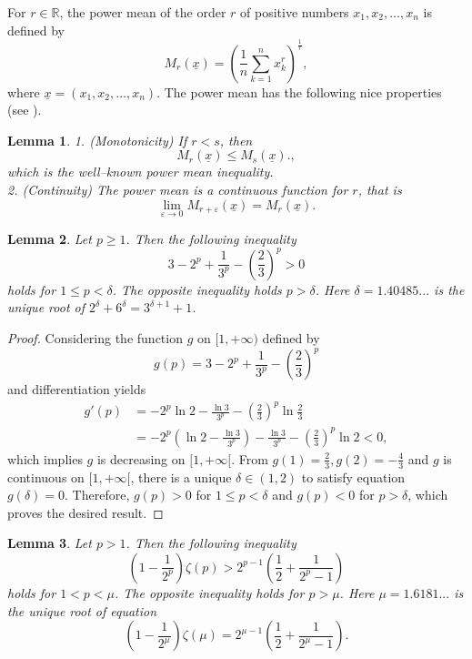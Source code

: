 \documentclass{amsart}
\newtheorem{lemma}{Lemma}
\begin{document}
For $r\in\mathbb{R}$, the power mean of the order $r$ of positive numbers $x_{1}, x_{2}, \ldots, x_{n}$ is defined by 
$$
M_{r}(\underline{x})=\left(\frac{1}{n} \sum_{k=1}^{n} x_{k}^{r}\right)^{\frac{1}{r}},
$$
where $\underline{x}=\left(x_{1}, x_{2}, \ldots, x_{n}\right)$. The power mean has the following nice properties (see \cite{bullen}).
\begin{lemma} 1. (Monotonicity)
If $r<s$, then
\begin{equation}\label{meanineq}
M_{r}(\underline{x}) \leq M_{s}(\underline{x})., 
\end{equation}
which is the well--known power mean inequality.\\
2. (Continuity) The power mean is a continuous function for $r$, that is
$$
\lim _{\varepsilon \rightarrow 0} M_{r+\varepsilon}(\underline{x})=M_{r}(\underline{x}).
$$
\end{lemma}
\begin{lemma}\label{lem2}
    Let $p\geq1$. Then the following inequality
    $$3-2^p+\frac{1}{3^p}-\left(\frac{2}{3}\right)^p>0$$
    holds for $1\leq p<\delta$. The opposite inequality holds $p>\delta$. Here $\delta=1.40485...$ is the unique root of $2^\delta + 6^\delta = 3^{\delta + 1} + 1$.
\end{lemma}
\begin{proof}
    Considering the function $g$ on $[1,+\infty)$ defined by 
    $$g(p)=3-2^p+\frac{1}{3^p}-\left(\frac{2}{3}\right)^p$$
    and differentiation yields
    \begin{align*}
     g'(p)&=-2^p\ln2-\frac{\ln3}{3^p}-\left(\frac{2}{3}\right)^p\ln\frac{2}{3}\\
     &=-2^p\left(\ln2-\frac{\ln3}{3^p}\right)-\frac{\ln3}{3^p}-\left(\frac{2}{3}\right)^p\ln2<0,
     \end{align*}
     which implies $g$ is decreasing on $[1,+\infty[$. From $g(1)=\frac{2}{3}, g(2)=-\frac{4}{3}$ and $g$ is continuous on $[1,+\infty[$, there is a unique $\delta\in(1,2)$ to satisfy equation $g(\delta)=0$. Therefore, $g(p)>0$ for $1\leq p<\delta$ and $g(p)<0$ for $p>\delta$, which proves the desired result.
\end{proof}
\begin{lemma}\label{lem3}
    Let $p>1$. Then the following inequality
    $$\left(1-\frac{1}{2^p}\right)\zeta(p)>2^{p-1}\left(\frac{1}{2}+\frac{1}{2^p-1}\right)$$
    holds for $1< p<\mu$. The opposite inequality holds for $p>\mu$. Here $\mu=1.6181...$ is the unique root of equation $$\left(1-\frac{1}{2^\mu}\right)\zeta(\mu)=2^{\mu-1}\left(\frac{1}{2}+\frac{1}{2^\mu-1}\right).$$
\end{lemma}
\end{document}
